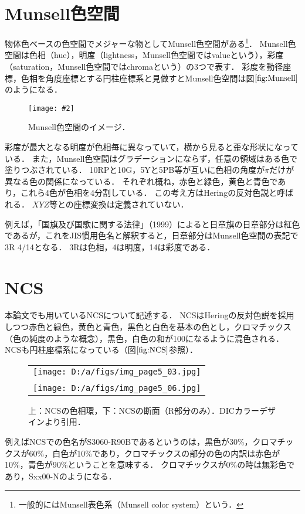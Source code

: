 \documentclass[uplatex,paper=a4,fontsize=4.0truemm,jafontsize=4.0truemm,head_space=30.0truemm,foot_space=30.0truemm,baselineskip=8.0truemm,line_length=40zw,gutter=25.0truemm,oneside,openany,fleqn,hanging_panctuation,open_bracket_pos=nibu_tentsuki,dvipdfmx,jis2004,book,titlepage]{jlreq}
\theoremstyle{mystyle}
\newcommand{\captiondot}[1]{\caption{#1．}}
\newcommand{\figureinput}[4]{\begin{figure}[tbp]\centering\texttt{[image: \#2]}\captiondot{#3}\label{fig:#4}\end{figure}}
\newcommand{\mathdisplaystyle}[1]{\(\displaystyle{#1}\)}
\newcommand{\Reference}[1]{\mathdisplaystyle{\ref{#1}}}
\begin{document}
		\section{Munsell色空間}
			物体色ベースの色空間でメジャーな物としてMunsell色空間がある\footnote{一般的にはMunsell表色系（Munsell color system）という．}．
			Munsell色空間は色相（hue），明度（lightness，Munsell色空間ではvalueという），彩度（saturation，Munsell色空間ではchromaという）の3つで表す．
			彩度を動径座標，色相を角度座標とする円柱座標系と見做すとMunsell色空間は図\Reference{fig:Munsell}のようになる．
			\figureinput{width=5truecm}{D:/a/figs/munsell3.png}{Munsell色空間のイメージ\protect\cite{Fukue2010}}{Munsell}
			彩度が最大となる明度が色相毎に異なっていて，横から見ると歪な形状になっている．
			また，Munsell色空間はグラデーションにならず，任意の領域はある色で塗りつぶされている．
			10RPと10G，5Yと5PB等が互いに色相の角度が\mathdisplaystyle{\pi}だけが異なる色の関係になっている．
			それぞれ概ね，赤色と緑色，黄色と青色であり，これら4色が色相を4分割している．
			この考え方はHeringの反対色説と呼ばれる．
			\mathdisplaystyle{XYZ}等との座標変換は定義されていない．

			例えば，「国旗及び国歌に関する法律」（1999）によると日章旗の日章部分は紅色であるが，これをJIS慣用色名と解釈すると，日章部分はMunsell色空間の表記で3R 4/14となる．
			3Rは色相，4は明度，14は彩度である．
		\section{NCS}
			本論文でも用いているNCSについて記述する．
			NCSはHeringの反対色説を採用しつつ赤色と緑色，黄色と青色，黒色と白色を基本の色とし，クロマチックス（色の純度のような概念），黒色，白色の和が100になるように混色される．
			NCSも円柱座標系になっている（図\Reference{fig:NCS}参照）．
			\begin{figure}[tbp]
				\centering
				\begin{tabular}{c}
					\begin{minipage}{\linewidth}
						\centering
						\texttt{[image: D:/a/figs/img\_page5\_03.jpg]}
					\end{minipage} \\
					\begin{minipage}{0.06\linewidth}
						\vspace{10truemm}
					\end{minipage} \\
					\begin{minipage}{\linewidth}
						\centering
						\texttt{[image: D:/a/figs/img\_page5\_06.jpg]}
					\end{minipage}
				\end{tabular}
				\captiondot{上：NCSの色相環，下：NCSの断面（R部分のみ）．DICカラーデザイン\protect\cite{DIC2015}より引用}\label{fig:NCS}
			\end{figure}
			例えばNCSでの色名がS3060-R90Bであるというのは，黒色が30\%，クロマチックスが60\%，白色が10\%であり，クロマチックスの部分の色の内訳は赤色が10\%，青色が90\%ということを意味する．
			クロマチックスが0\%の時は無彩色であり，Sxx00-Nのようになる．
\end{document}
